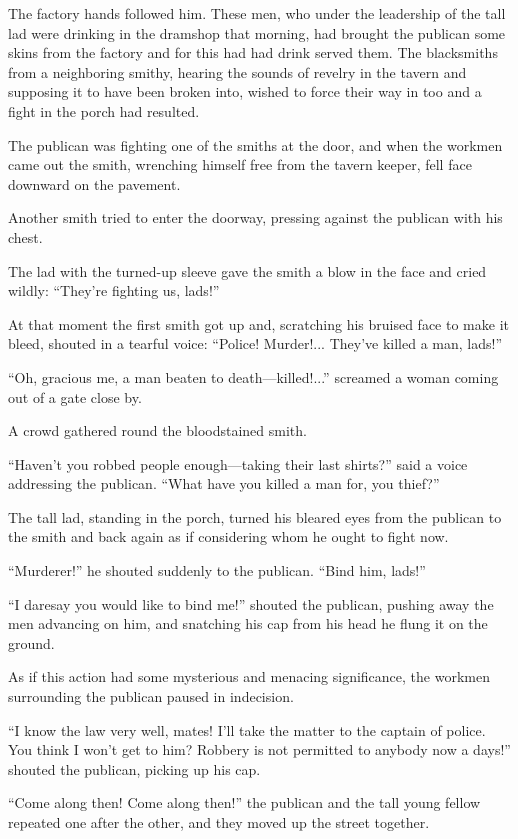 The factory hands followed him. These men, who under the
leadership of the tall lad were drinking in the dramshop that
morning, had brought the publican some skins from the factory and
for this had had drink served them. The blacksmiths from a
neighboring smithy, hearing the sounds of revelry in the tavern
and supposing it to have been broken into, wished to force their
way in too and a fight in the porch had resulted.

The publican was fighting one of the smiths at the door, and when
the workmen came out the smith, wrenching himself free from the
tavern keeper, fell face downward on the pavement.

Another smith tried to enter the doorway, pressing against the
publican with his chest.

The lad with the turned-up sleeve gave the smith a blow in the
face and cried wildly: ``They're fighting us, lads!''

At that moment the first smith got up and, scratching his bruised
face to make it bleed, shouted in a tearful voice: ``Police!
Murder!...  They've killed a man, lads!''

``Oh, gracious me, a man beaten to death---killed!...'' screamed
a woman coming out of a gate close by.

A crowd gathered round the bloodstained smith.

``Haven't you robbed people enough---taking their last shirts?''
said a voice addressing the publican. ``What have you killed a
man for, you thief?''

The tall lad, standing in the porch, turned his bleared eyes from
the publican to the smith and back again as if considering whom
he ought to fight now.

``Murderer!'' he shouted suddenly to the publican. ``Bind him,
lads!''

``I daresay you would like to bind me!'' shouted the publican,
pushing away the men advancing on him, and snatching his cap from
his head he flung it on the ground.

As if this action had some mysterious and menacing significance,
the workmen surrounding the publican paused in indecision.

``I know the law very well, mates! I'll take the matter to the
captain of police. You think I won't get to him? Robbery is not
permitted to anybody now a days!'' shouted the publican, picking
up his cap.

``Come along then! Come along then!'' the publican and the tall
young fellow repeated one after the other, and they moved up the
street together.

